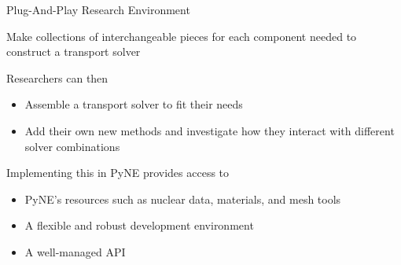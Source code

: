 \documentclass[xcolor=x11names,compress]{beamer}
\renewcommand{\(}{\begin{columns}}
\renewcommand{\)}{\end{columns}}
\newcommand{\<}[1]{\begin{column}{#1}}
\renewcommand{\>}{\end{column}}
\begin{document}
\begin{frame}{Plug-And-Play Research Environment}

    Make collections of \textcolor{dgreen}{interchangeable pieces} for each component
    needed to construct a transport solver
    
    \vspace*{1em}
    Researchers can then 
    \begin{itemize}
    \item \textcolor{dgreen}{Assemble} a transport solver to fit their needs
    \item \textcolor{dgreen}{Add} their own new methods and investigate how 
    they interact with different solver combinations
    \end{itemize}

    \vspace*{1em}
    Implementing this in PyNE provides access to 
    \begin{itemize}
    \item PyNE's \textcolor{dgreen}{resources} such as nuclear data, materials, 
    and mesh tools  
    \item A flexible and robust \textcolor{dgreen}{development environment} 
    \item A well-managed \textcolor{dgreen}{API}
    \end{itemize}

\end{frame}

%	
%	
\end{document}
